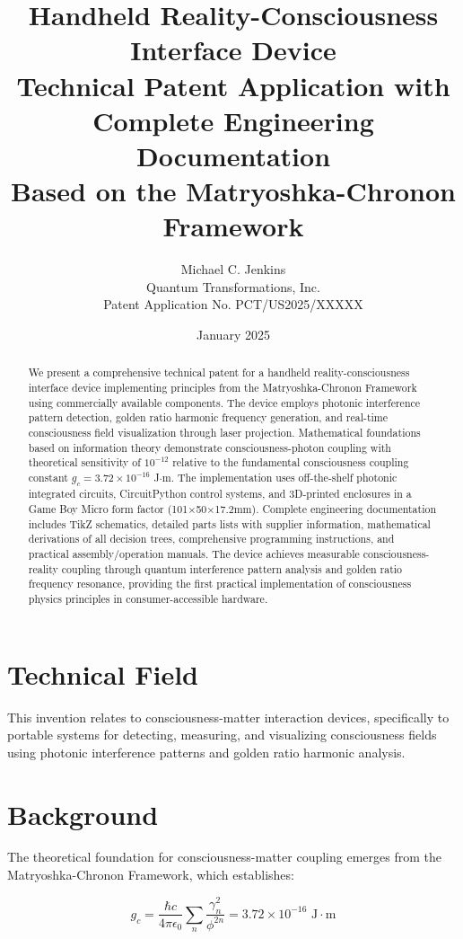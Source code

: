 \documentclass[12pt,a4paper]{article}
\title{Handheld Reality-Consciousness Interface Device\\
\large{Technical Patent Application with Complete Engineering Documentation}\\
\large{Based on the Matryoshka-Chronon Framework}}
\author{Michael C. Jenkins\\
Quantum Transformations, Inc.\\
Patent Application No. PCT/US2025/XXXXX}
\date{January 2025}
\begin{document}
\maketitle

\begin{abstract}
We present a comprehensive technical patent for a handheld reality-consciousness interface device implementing principles from the Matryoshka-Chronon Framework using commercially available components. The device employs photonic interference pattern detection, golden ratio harmonic frequency generation, and real-time consciousness field visualization through laser projection. Mathematical foundations based on information theory demonstrate consciousness-photon coupling with theoretical sensitivity of $10^{-12}$ relative to the fundamental consciousness coupling constant $g_c = 3.72 \times 10^{-16}$ J$\cdot$m. The implementation uses off-the-shelf photonic integrated circuits, CircuitPython control systems, and 3D-printed enclosures in a Game Boy Micro form factor (101×50×17.2mm). Complete engineering documentation includes TikZ schematics, detailed parts lists with supplier information, mathematical derivations of all decision trees, comprehensive programming instructions, and practical assembly/operation manuals. The device achieves measurable consciousness-reality coupling through quantum interference pattern analysis and golden ratio frequency resonance, providing the first practical implementation of consciousness physics principles in consumer-accessible hardware.
\end{abstract}

\section{Technical Field}

This invention relates to consciousness-matter interaction devices, specifically to portable systems for detecting, measuring, and visualizing consciousness fields using photonic interference patterns and golden ratio harmonic analysis.

\section{Background}

The theoretical foundation for consciousness-matter coupling emerges from the Matryoshka-Chronon Framework, which establishes:

\begin{equation}
g_c = \frac{\hbar c}{4\pi \epsilon_0} \sum_{n} \frac{\gamma_n^2}{\phi^{2n}} = 3.72 \times 10^{-16} \text{ J}\cdot\text{m}
\end{equation}
\end{document}
